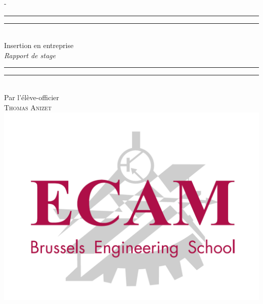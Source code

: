 %
%
% 
%
%
\begin{titlingpage}
\begin{SingleSpace}
\calccentering{\unitlength} 
\begin{adjustwidth*}{\unitlength}{-\unitlength}
\vspace*{13mm}
\begin{center}
\rule[0.5ex]{\linewidth}{2pt}\vspace*{-\baselineskip}\vspace*{3.2pt}
\rule[0.5ex]{\linewidth}{1pt}\\[\baselineskip]
{\HUGE Insertion en entreprise }\\[4mm]
{\Large \textit{Rapport de stage}}\\
\rule[0.5ex]{\linewidth}{1pt}\vspace*{-\baselineskip}\vspace{3.2pt}
\rule[0.5ex]{\linewidth}{2pt}\\
\vspace{6.5mm}
{\large Par l'élève-officier}\\
\vspace{6.5mm}
{\large\textsc{Thomas Anizet}}\\
\vspace{11mm}
\includegraphics[scale=0.2]{logos/logo-ecam.png}\\

\end{center}
\end{adjustwidth*}
\end{SingleSpace}
\end{titlingpage}
